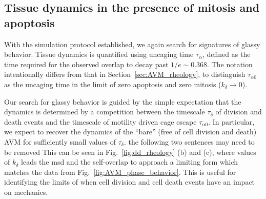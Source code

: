 \documentclass[
reprint
,aps
,amssymb
,amsmath
,superscriptaddress
]{revtex4-1}
\newcommand{\mdc}[1]{{\color{blue}#1}}
\begin{document}

\subsection{Tissue dynamics in the presence of mitosis and apoptosis}

With the simulation protocol established, we again search for signatures of glassy behavior. Tissue dynamics is quantified using uncaging time $\tau_\alpha$, defined as the time required for the observed overlap to decay past $1/e \sim 0.368$. The notation intentionally differs from that in Section~\ref{sec:AVM_rheology}, to distinguish $\tau_{\alpha0}$ as the uncaging time in the limit of zero apoptosis and zero mitosis ($k_{\delta} \to 0$).

Our search for glassy behavior is guided by the simple expectation that the dynamics is determined by a competition between the timescale $\tau_\delta$ of division and death events and the timescale of motility driven cage escape $\tau_{\alpha0}$. In particular, we expect to recover the dynamics of the ``bare'' (free of cell division and death) AVM for sufficiently small values of $\tau_\delta$. \mdc{the following two sentences may need to be removed} This can be seen in Fig.~\ref{fig:dd_rheology} (b) and (c), where values of $k_\delta$ leads the msd and the self-overlap to approach a limiting form which matches the data from Fig.~\ref{fig:AVM_phase_behavior}. This is useful for identifying the limits of when cell division and cell death events have an impact on mechanics.
\end{document}
